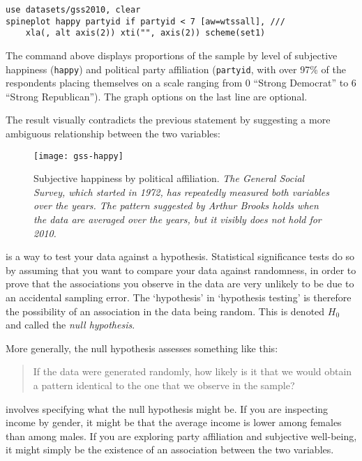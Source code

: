 \begin{verbatim}
use datasets/gss2010, clear
spineplot happy partyid if partyid < 7 [aw=wtssall], ///
    xla(, alt axis(2)) xti("", axis(2)) scheme(set1)
\end{verbatim}

The  command above displays proportions of the sample by level of subjective happiness (\texttt{happy}) and political party affiliation (\texttt{partyid}, with over 97\% of the respondents placing themselves on a scale ranging from 0 ``Strong Democrat'' to 6 ``Strong Republican''). The graph options on the last line are optional.

The result visually contradicts the previous statement by suggesting a more ambiguous relationship between the two variables:

\begin{figure}
  \texttt{[image: gss-happy]}
  \caption[Subjective happiness by political affiliation.]%
  {Subjective happiness by political affiliation. %
  \emph{The General Social Survey, which started in 1972, has repeatedly measured both variables over the years. The pattern suggested by Arthur Brooks holds when the data are averaged over the years, but it visibly does not hold for 2010.}}%
  \label{fig:stata-window}
\end{figure}

 is a way to test your data against a hypothesis. Statistical significance tests do so by assuming that you want to compare your data against randomness, in order to prove that the associations you observe in the data are very unlikely to be due to an accidental sampling error. The `hypothesis' in `hypothesis testing' is therefore the possibility of an association in the data being random. This is denoted $H_0$ and called the \emph{null hypothesis}.

More generally, the null hypothesis assesses something like this:

\begin{quote}
If the data were generated randomly, how likely is it that we would obtain a pattern identical to the one that we observe in the sample?
\end{quote}

 involves specifying what the null hypothesis might be. If you are inspecting income by gender, it might be that the average income is lower among females than among males. If you are exploring party affiliation and subjective well-being, it might simply be the existence of an association between the two variables. 

